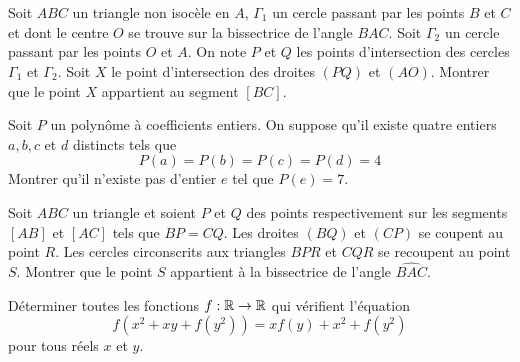 

\begin{exo}
Soit $ABC$ un triangle non isocèle en $A$, $\Gamma_1$ un cercle passant par les points $B$ et $C$ et dont le centre $O$ se trouve sur la bissectrice de l'angle $\widehat{BAC}$. Soit $\Gamma_2$ un cercle passant par les points $O$ et $A$. On note $P$ et $Q$ les points d'intersection des cercles $\Gamma_1$ et $\Gamma_2$. Soit $X$ le point d'intersection des droites $(PQ)$ et $(AO)$. Montrer que le point $X$ appartient au segment $[BC]$.
\end{exo}


\begin{exo}
Soit $P$ un polynôme à coefficients entiers. On suppose qu'il existe quatre entiers $a, b, c$ et $d$ distincts tels que
$$P(a) = P(b) = P(c) = P(d) = 4$$
\noindent Montrer qu'il n'existe pas d'entier $e$ tel que $P(e) = 7$. 
\end{exo}


\begin{exo}
Soit $ABC$ un triangle et soient $P$ et $Q$ des points respectivement sur les segments $[AB]$ et $[AC]$ tels que $BP=CQ$. Les droites $(BQ)$ et $(CP)$ se coupent au point $R$. Les cercles circonscrits aux triangles $BPR$ et $CQR$ se recoupent au point $S$. Montrer que le point $S$ appartient à la bissectrice de l'angle $\widehat{BAC}$.
\end{exo}

\begin{exo}
Déterminer toutes les fonctions $f : \mathbb R \rightarrow \mathbb R$ qui vérifient l'équation
$$f\left(x^2+xy+f(y^2)\right)=xf(y)+x^2+f(y^2)$$
pour tous réels $x$ et $y$.
\end{exo}




